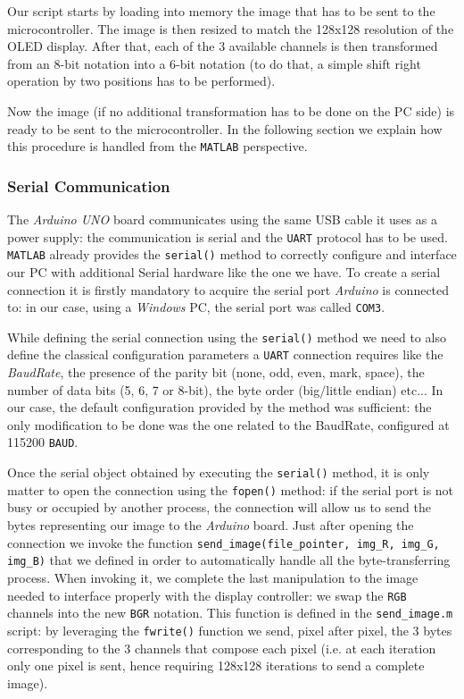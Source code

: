 \documentclass[a4paper]{article}
\begin{document}
            Our script starts by loading into memory the image that has to be sent to the microcontroller. The image is then resized to match the 128x128 resolution of the OLED display. After that, each of the 3 available channels is then transformed from an 8-bit notation into a 6-bit notation (to do that, a simple shift right operation by two positions has to be performed).

            Now the image (if no additional transformation has to be done on the PC side) is ready to be sent to the microcontroller. In the following section we explain how this procedure is handled from the \texttt{MATLAB} perspective.

        \subsubsection{Serial Communication}
            The \emph{Arduino UNO} board communicates using the same USB cable it uses as a power supply: the communication is serial and the \texttt{UART} protocol has to be used.
            \texttt{MATLAB} already provides the \texttt{serial()} method to correctly configure and interface our PC with additional Serial hardware like the one we have.
            To create a serial connection it is firstly mandatory to acquire the serial port \emph{Arduino} is connected to: in our case, using a \emph{Windows} PC, the serial port was called \texttt{COM3}.

            While defining the serial connection using the \texttt{serial()} method we need to also define the classical configuration parameters a \texttt{UART} connection requires like the \emph{BaudRate}, the presence of the parity bit (none, odd, even, mark, space), the number of data bits (5, 6, 7 or 8-bit), the byte order (big/little endian) etc... In our case, the default configuration provided by the method was sufficient: the only modification to be done was the one related to the BaudRate, configured at 115200 \texttt{BAUD}.

            Once the serial object obtained by executing the \texttt{serial()} method, it is only matter to open the connection using the \texttt{fopen()} method: if the serial port is not busy or occupied by another process, the connection will allow us to send the bytes representing our image to the \emph{Arduino} board.
            Just after opening the connection we invoke the function \texttt{send\_image(file\_pointer, img\_R, img\_G, img\_B)} that we defined in order to automatically handle all the byte-transferring process.
            When invoking it, we complete the last manipulation to the image needed to interface properly with the display controller: we swap the \texttt{RGB} channels into the new \texttt{BGR} notation.
            This function is defined in the \texttt{send\_image.m} script: by leveraging the \texttt{fwrite()} function we send, pixel after pixel, the 3 bytes corresponding to the 3 channels that compose each pixel (i.e. at each iteration only one pixel is sent, hence requiring 128x128 iterations to send a complete image).
\end{document}
